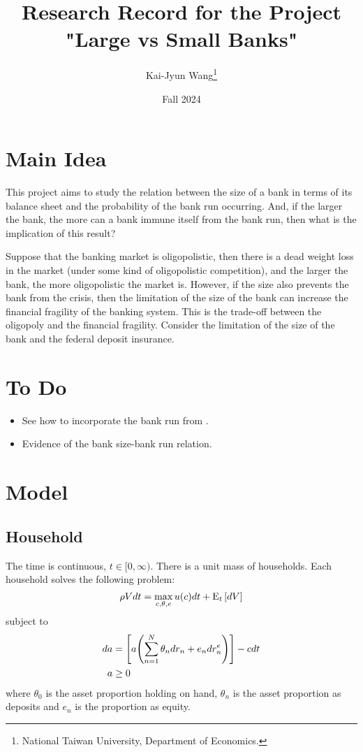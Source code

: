 \documentclass[a4paper, 12pt]{article}
\title{Research Record for the Project "Large vs Small Banks"}
\author{Kai-Jyun Wang\thanks{National Taiwan University, Department of Economics.}}
\date{Fall 2024}
\begin{document}
 
\maketitle

\section{Main Idea} 
This project aims to study the relation between the size of a 
bank in terms of its balance sheet and the probability of the 
bank run occurring. And, if the larger the bank, the more can 
a bank immune itself from the bank run, then what is the 
implication of this result? 

Suppose that the banking market is oligopolistic, then there 
is a dead weight loss in the market (under some kind of oligopolistic 
competition), and the larger the bank, the more oligopolistic the 
market is. However, if the size also prevents the bank from the 
crisis, then the limitation of the size of the bank can increase 
the financial fragility of the banking system. This is the 
trade-off between the oligopoly and the financial fragility. 
Consider the limitation of the size of the bank and the federal 
deposit insurance. 

\section{To Do}
\begin{itemize}
    \item See how to incorporate the bank run from \cite{diamond1983}.  
    \item Evidence of the bank size-bank run relation.
\end{itemize}

\section{Model} 
\subsection{Household}
The time is continuous, $t\in[0,\infty)$. There is a unit mass of households. 
Each household solves the following problem:
\begin{equation}
    \rho Vdt = \max_{c,\theta,e} u(c)dt + {\operatorname{E}}_t\left[ {dV} \right]
\end{equation}
subject to 
\begin{align}
    da &= \sbrc{a\pth{\sum_{n=1}^N\theta_ndr_n + e_ndr^e_n}} - cdt \\
    a &\geq 0
\end{align}
where $\theta_0$ is the asset proportion holding on hand, $\theta_n$ is the asset 
proportion as deposits and $e_n$ is the proportion as equity. 
\end{document}
